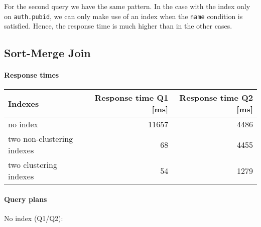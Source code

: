 \documentclass[11pt]{scrartcl}
\begin{document}
For the second query we have the same pattern.
In the case with the index only on \texttt{auth.pubid}, we can only make use of an index when the \texttt{name} condition
is satisfied.
Hence, the response time is much higher than in the other cases.

\subsection*{Sort-Merge Join}

\paragraph{Response times}\mbox{}

\begin{table}[H]
  \centering
  \begin{tabular}{l|r|r}
    Indexes & Response time Q1 [ms] & Response time Q2 [ms] \tabularnewline
    \hline
    no index & 11657 & 4486 \tabularnewline
    two non-clustering indexes & 68 & 4455 \tabularnewline
    two clustering indexes & 54 & 1279 \tabularnewline
  \end{tabular}
\end{table}

\paragraph{Query plans}\mbox{}

No index (Q1/Q2):
\end{document}
